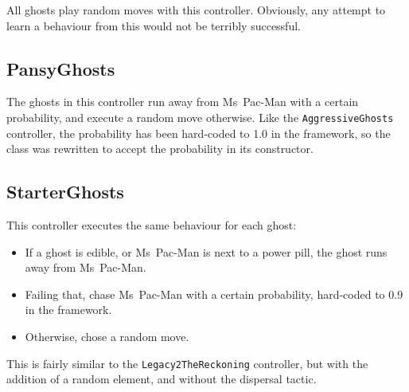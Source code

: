 All ghosts play random moves with this controller.  Obviously, any attempt to learn a behaviour from this would not be terribly successful.

\subsection{PansyGhosts}

The ghosts in this controller run away from Ms~Pac-Man with a certain probability, and execute a random move otherwise.  Like the {\tt AggressiveGhosts} controller, the probability has been hard-coded to 1.0 in the framework, so the class was rewritten to accept the probability in its constructor.

\subsection{StarterGhosts}

This controller executes the same behaviour for each ghost:

\begin{itemize}
\item If a ghost is edible, or Ms~Pac-Man is next to a power pill, the ghost runs away from Ms~Pac-Man.
\item Failing that, chase Ms~Pac-Man with a certain probability, hard-coded to 0.9 in the framework.
\item Otherwise, chose a random move.
\end{itemize}

This is fairly similar to the {\tt Legacy2TheReckoning} controller, but with the addition of a random element, and without the dispersal tactic.

